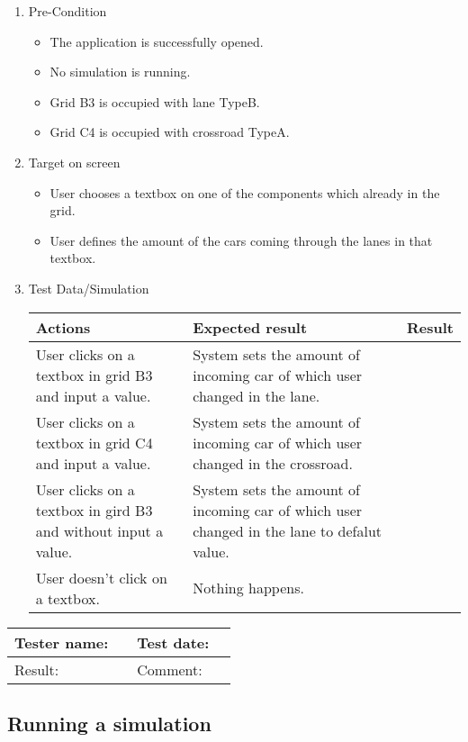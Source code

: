 \begin{enumerate}
	\item Pre-Condition
	\begin{itemize}
		\item The application is successfully opened.
		\item No simulation is running.
		\item Grid B3 is occupied with lane TypeB.
		\item Grid C4 is occupied with crossroad TypeA.
	\end{itemize}
	\item Target on screen
	\begin{itemize}
		\item User chooses a textbox on one of the components which already in the grid.
		\item User defines the amount of the cars coming through the lanes in that textbox.
	\end{itemize}
	\item Test Data/Simulation
	
	\begin{tabularx}{\textwidth}{|X|X|p{2.5cm}|}\hline
		Actions & Expected result & Result \\\hline
		User clicks on a textbox in grid B3 and input a value. & System sets the amount of incoming car of which user changed in the lane. & \pass \\\hline
		User clicks on a textbox in grid C4 and input a value. & System sets the amount of incoming car of which user changed in the crossroad. & \pass \\\hline
		User clicks on a textbox in gird B3 and without input a value. & System sets the amount of incoming car of which user changed in the lane to defalut value. & \pass \\\hline
		User doesn't click on a textbox. & Nothing happens. &  \pass \\\hline
	\end{tabularx}
	
\end{enumerate}

\begin{tabularx}{\textwidth}{|p{3cm}X|p{3cm}X|}\hline
	Tester name: &  & Test date: & \\\hline
	Result: &   \pass & Comment: & \\\hline
\end{tabularx}

\newpage 

\subsection{Running a simulation}

